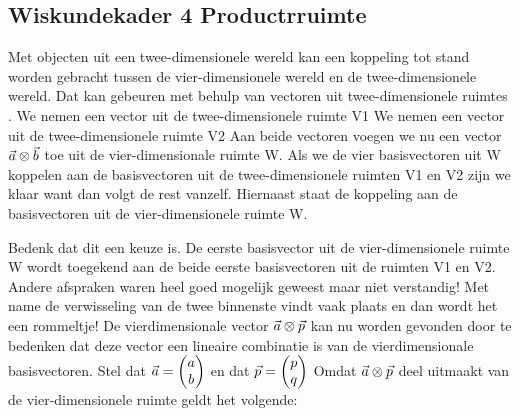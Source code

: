\documentclass[../main.tex]{subfiles}
\begin{document}
\begin{mdframed}[style=wiskader,frametitle={Matrixen}]
\section{Wiskundekader 4 Productrruimte}
Met objecten uit een twee-dimensionele wereld kan een koppeling tot stand worden gebracht tussen de vier-dimensionele wereld en de twee-dimensionele wereld. Dat kan gebeuren met behulp van vectoren uit twee-dimensionele ruimtes .
We nemen een vector  uit de twee-dimensionele ruimte V1 
We nemen een vector  uit de twee-dimensionele ruimte V2 
Aan beide vectoren voegen we nu een vector $\vec{a} \otimes \vec{b}$ toe uit de vier-dimensionale ruimte W.
Als we de vier basisvectoren uit W koppelen aan de basisvectoren uit de twee-dimensionele ruimten V1 en V2 zijn we klaar want dan volgt de rest vanzelf.
Hiernaast staat de koppeling aan de basisvectoren uit de vier-dimensionele ruimte W.

Bedenk dat dit een keuze is. De eerste basisvector uit de vier-dimensionele ruimte W wordt toegekend aan de beide eerste basisvectoren uit de ruimten V1 en V2.
Andere afspraken waren heel goed mogelijk geweest maar niet verstandig! Met name de verwisseling van de twee binnenste vindt vaak plaats en dan wordt het een rommeltje!
De vierdimensionale vector $\vec{a} \otimes \vec{p}$ kan nu worden gevonden door te bedenken dat deze vector een lineaire combinatie is van de vierdimensionale basisvectoren. 
Stel dat $\vect{a} = \mqty(a\\b)$ en dat $\vect{p} = \mqty(p\\q)$ 
Omdat $\vec{a}\otimes \vec{p}$ deel uitmaakt van de vier-dimensionele ruimte geldt het volgende:


\end{mdframed}
\end{document}
